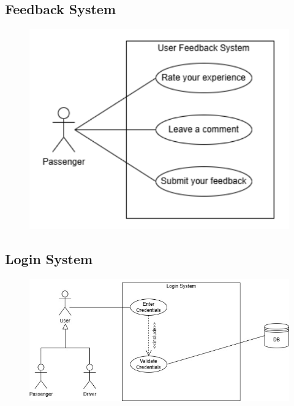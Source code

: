 \documentclass[a4paper,12pt]{article}
\begin{document}
  \subsection*{Feedback System}
    \begin{figure}[H]
      \centering
      \includegraphics[width=1\textwidth]{UserFeedback.png} 
    \end{figure}
  \subsection*{Login System}
    \begin{figure}[H]
      \centering
      \includegraphics[width=1\textwidth]{Login System.jpg} 
    \end{figure}
\end{document}
